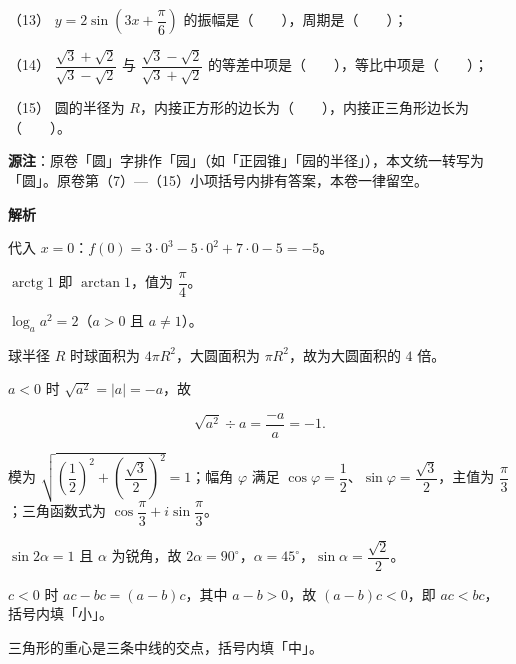 \begin{answer}
（13） $y=2\sin\left(3x+\dfrac{\pi}{6}\right)$ 的振幅是\mbox{（　　）}，周期是\mbox{（　　）}；

（14） $\dfrac{\sqrt3+\sqrt2}{\sqrt3-\sqrt2}$ 与 $\dfrac{\sqrt3-\sqrt2}{\sqrt3+\sqrt2}$ 的等差中项是\mbox{（　　）}，等比中项是\mbox{（　　）}；

（15） 圆的半径为 $R$，内接正方形的边长为\mbox{（　　）}，内接正三角形边长为\mbox{（　　）}。

\begin{gktip}
\textbf{源注}：原卷「圆」字排作「园」（如「正园锥」「园的半径」），本文统一转写为「圆」。原卷第（7）—（15）小项括号内排有答案，本卷一律留空。
\end{gktip}

\textbf{解析}


代入 $x=0$：$f(0)=3\cdot 0^3-5\cdot 0^2+7\cdot 0-5=-5$。


$\operatorname{arctg}1$ 即 $\arctan 1$，值为 $\dfrac{\pi}{4}$。


$\log_a a^2=2$（$a>0$ 且 $a\ne1$）。


球半径 $R$ 时球面积为 $4\pi R^2$，大圆面积为 $\pi R^2$，故为大圆面积的 $4$ 倍。


$a<0$ 时 $\sqrt{a^2}=|a|=-a$，故

\nopagebreak[4]
\[
\sqrt{a^2}\div a=\frac{-a}{a}=-1.
\]


模为 $\sqrt{\left(\dfrac12\right)^2+\left(\dfrac{\sqrt3}{2}\right)^2}=1$；幅角 $\varphi$ 满足 $\cos\varphi=\dfrac12$、$\sin\varphi=\dfrac{\sqrt3}{2}$，主值为 $\dfrac{\pi}{3}$；三角函数式为 $\cos\dfrac{\pi}{3}+i\sin\dfrac{\pi}{3}$。


$\sin 2\alpha=1$ 且 $\alpha$ 为锐角，故 $2\alpha=90^\circ$，$\alpha=45^\circ$，$\sin\alpha=\dfrac{\sqrt2}{2}$。


$c<0$ 时 $ac-bc=(a-b)c$，其中 $a-b>0$，故 $(a-b)c<0$，即 $ac<bc$，括号内填「小」。


三角形的重心是三条中线的交点，括号内填「中」。



\end{answer}
